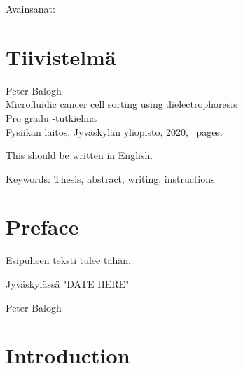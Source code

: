 \documentclass[draft]{jyflluk}
\newcommand{\Otsikko}{Microfluidic cancer cell sorting using dielectrophoresis}
\begin{document}
\bigskip

\noindent Avainsanat: 

\section*{Tiivistelmä}

Peter Balogh\\
\Otsikko \\
Pro gradu -tutkielma \\
Fysiikan laitos, Jyväskylän yliopisto, 2020, \pageref{LastPage}~pages.

\bigskip

\begin{otherlanguage}{english}
\noindent This should be written in English.
\end{otherlanguage}

\bigskip 

\noindent Keywords: Thesis, abstract, writing, instructions

\section*{Preface}

Esipuheen teksti tulee tähän.

\bigskip

Jyväskylässä "DATE HERE"

\bigskip

Peter Balogh

\tableofcontents

\section{Introduction}
\label{sec:introduction}
\end{document}
